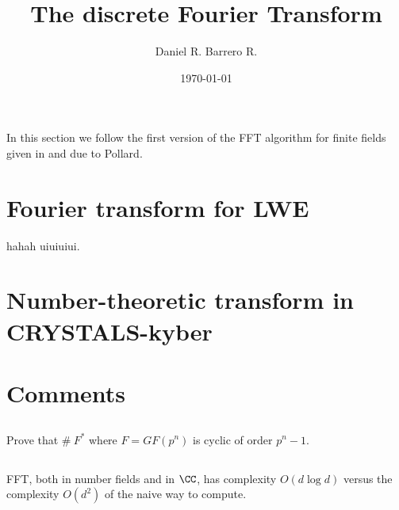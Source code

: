 \documentclass{amsart}
\title{The discrete Fourier Transform}
\author{Daniel R. Barrero R.}
\date{\today}
\begin{document}
\maketitle

\section{}

In this section we follow the first version of the FFT algorithm for finite
fields given in \cite{pollard-fftFiniteFields-1971} and due to Pollard.



\section{Fourier transform for LWE}

hahah \cite{regev-LWE-2009} uiuiuiui.

\section{Number-theoretic transform in CRYSTALS-kyber}

\section{Comments}

\subsection{} Prove that $\# \ F^*$ where $F = GF(p^n)$ is cyclic of order
$p^n - 1$.

\subsection{} FFT, both in number fields and in $\CC$, has complexity
$O(d \log d)$ versus the complexity $O(d^2)$ of the naive way to compute.



\end{document}
